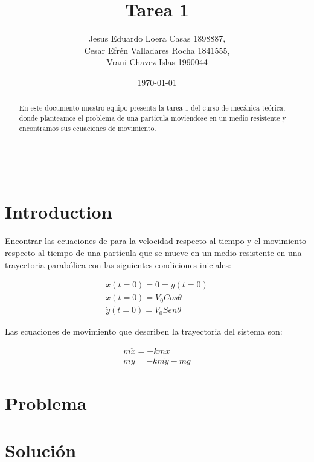 \documentclass{article}
\title{Tarea 1}
\author{Jesus Eduardo Loera Casas 1898887,\\ Cesar Efrén Valladares Rocha 1841555,\\ Vrani Chavez Islas 1990044}
\date{\today}
\begin{document}


\tableofcontents			%

\begin{center}
	\rule[0mm]{150mm}{0.1mm}		%
	\end{center}
	
	
\begin{abstract}		%

	\noindent 				%
	En este documento nuestro equipo presenta la tarea 1 del curso de mecánica teórica, donde planteamos 
  el problema de una particula moviendose en un medio resistente y encontramos sus ecuaciones de 
  movimiento.
	\end{abstract}
	
\begin{center}
	\rule[0mm]{150mm}{0.1mm}
	\end{center}

\section{Introduction}		%
                            
  Encontrar las ecuaciones de para la velocidad respecto al tiempo y el movimiento respecto
  al tiempo de una partícula que se mueve en un medio resistente en una trayectoria parabólica 
  con las siguientes condiciones iniciales:

  \begin{gather*}
    x(t=0)=0=y(t=0) \\
    \dot{x} (t=0) = V_{0} Cos\theta \\
    \dot{y} (t=0) = V_{0} Sen\theta 
  \end{gather*}

  Las ecuaciones de movimiento que describen la trayectoria del sistema son:

  \begin{gather*}
    m\ddot{x} = -km\dot{x} \\
    m\ddot{y} = -km\dot{y}-mg
  \end{gather*}

\section{Problema}

\section{Solución}


\end{document}
